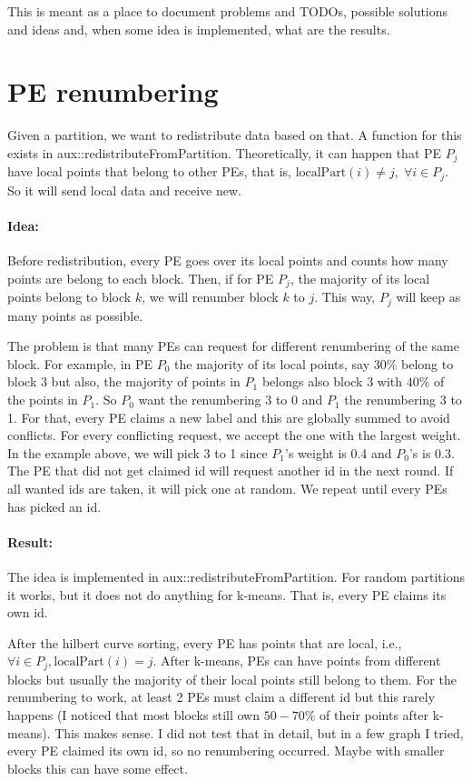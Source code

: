 \documentclass[a4paper,10pt]{article}
\author{Harry Tzovas}
\begin{document}
This is meant as a place to document problems and TODOs, possible solutions and ideas and, when some
idea is implemented, what are the results.

\section*{PE renumbering}
Given a partition, we want to redistribute data based on that. A function for this  exists in
aux::redistributeFromPartition. Theoretically, it can happen that PE $P_j$ have local points that belong
to other PEs, that is, $\text{localPart}(i)\neq j,\; \forall i\in P_j$. So it will send local data and receive new.

\paragraph*{Idea:}  Before redistribution, every PE goes over its local points and counts how many points
are belong to each block. Then, if for PE $P_j$, the majority of its local points belong to block $k$,
we will renumber block $k$ to $j$. This way, $P_j$ will keep as many points as possible. 

The problem is that many PEs can request for different renumbering of the same block. 
For example, in PE $P_0$ the majority of its local points, say $30\%$ belong to block $3$ 
but also, the majority of points in $P_1$ belongs also block $3$ with $40\%$ of the points in $P_1$. 
So $P_0$ want the renumbering 3 to 0 and $P_1$ the renumbering
3 to 1. For that, every PE claims a new label and this are globally summed to avoid conflicts.
For every conflicting request, we accept the one with the largest weight. In the example above,
we will pick 3 to 1 since $P_1$'s weight is 0.4 and $P_0$'s is 0.3. The PE that did not get claimed
id will request another id in the next round. If all wanted ids are taken, it will pick one
at random. We repeat until every PEs has picked an id.

\paragraph*{Result:} The idea is implemented in aux::redistributeFromPartition. For random partitions
it works, but it does not do anything for k-means. That is, every PE claims its own id.

After the hilbert curve sorting, every PE has points that are local, i.e., $\forall i \in P_j,
\text{localPart}(i)=j$. After k-means, PEs can have points from different blocks but usually
the majority of their local points still belong to them. For the renumbering to work, at least
2 PEs must claim a different id but this rarely happens (I noticed that most blocks still own
$50-70\%$ of their points after k-means). This makes sense. I did not test that in detail, but in
a few graph I tried, every PE claimed its own id, so no renumbering occurred. Maybe with smaller 
blocks this can have some effect.
\end{document}

